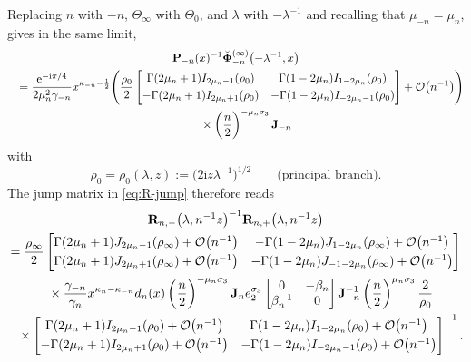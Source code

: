\documentclass[11pt]{article}
\numberwithin{equation}{section}
\numberwithin{equation}{section}
\newcommand{\ee}{\mathrm{e}}
\newcommand{\ii}{\mathrm{i}}
\newcommand{\para}[1]{\breve{#1}}
\begin{document}
Replacing $n$ with $-n$, $\Theta_\infty$ with $\Theta_0$, and $\lambda$ with $-\lambda^{-1}$ and recalling that $\mu_{-n} = \mu_n$, gives in the same limit,
\begin{gather*}
 \mathbf{P}_{-n}(x)^{-1}\para{\mathbf{\Phi}}_{-n}^{(\infty)}\bigl(-\lambda^{-1},x\bigr)
\\
 \quad =\frac{\ee^{-\ii\pi/4}}{2\mu_n^2\gamma_{-n}}x^{\kappa_{-n}-\frac{1}{2}}\Bigg(\frac{\rho_0}{2}\begin{bmatrix}{\Gamma(2\mu_n+1)}{} I_{2\mu_n-1}(\rho_0) & {\Gamma(1-2\mu_n)}{} I_{1-2\mu_n}(\rho_0) \vspace{1mm}\\
 -{\Gamma(2\mu_n+1)}{}I_{2\mu_n+1}(\rho_0)&-{\Gamma(1-2\mu_n)}{}I_{-2\mu_n-1}(\rho_0)
 \end{bmatrix} +\mathcal{O}\big(n^{-1}\big)\Bigg)\\
\phantom{ \quad =}{} \times \left(\frac{n}{2}\right)^{-\mu_n \sigma_3}
 \mathbf{J}_{-n}
\end{gather*}
with
\begin{equation}
\rho_0=\rho_0(\lambda,z):=\big(2\ii z\lambda^{-1}\big)^{1/2}\qquad\text{(principal branch)}.
\label{eq:rho-zero-branch}
\end{equation}
The jump matrix in \eqref{eq:R-jump} therefore reads
\begin{gather}
 \mathbf{R}_{n,-}\big(\lambda,n^{-1}z\big)^{-1}
 \mathbf{R}_{n,+}\big(\lambda,n^{-1}z\big) \nonumber\\
 = \frac{\rho_\infty}{2}\begin{bmatrix}
 \Gamma(2\mu_n+1) J_{2\mu_n-1}(\rho_\infty)+ \mathcal{O}\big(n^{-1}\big) & -\Gamma(1-2\mu_n) J_{1-2\mu_n}(\rho_\infty)+ \mathcal{O}\big(n^{-1}\big) \vspace{1mm}\\
 \Gamma(2\mu_n+1) J_{2\mu_n+1}(\rho_\infty)+ \mathcal{O}\big(n^{-1}\big) & -\Gamma(1-2\mu_n) J_{-1-2\mu_n}(\rho_\infty)+ \mathcal{O}\big(n^{-1}\big)
 \end{bmatrix}\nonumber\\
\phantom{ =}{} \times{} \frac{\gamma_{-n}}{\gamma_n}x^{\kappa_n-\kappa_{-n}}d_n(x)\left(\frac{n}{2}\right)^{-\mu_n\sigma_3}\mathbf{J}_ne_2^{\sigma_3}\begin{bmatrix}0 & -\beta_n\\\beta_n^{-1} & 0\end{bmatrix}\mathbf{J}_{-n}^{-1}\left(\frac{n}{2}\right)^{\mu_n\sigma_3}\frac{2}{\rho_0}\nonumber
 \\
\phantom{ =}{}\times \begin{bmatrix}{\Gamma(2\mu_n+1)}{} I_{2\mu_n-1}(\rho_0)+ \mathcal{O}\big(n^{-1}\big) & {\Gamma(1-2\mu_n)}{} I_{1-2\mu_n}(\rho_0)+ \mathcal{O}\big(n^{-1}\big) \vspace{1mm}\\
 -{\Gamma(2\mu_n+1)}{}I_{2\mu_n+1}(\rho_0)+ \mathcal{O}\big(n^{-1}\big)&-{\Gamma(1-2\mu_n)}{}I_{-2\mu_n-1}(\rho_0)+ \mathcal{O}\big(n^{-1}\big)
 \end{bmatrix}^{-1}.
 \label{eq:E-hat-jump-1}
\end{gather}
\end{document}
